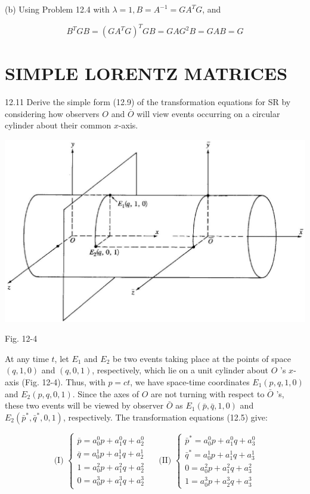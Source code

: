 \documentclass[10pt]{article}
\begin{document}
(b) Using Problem 12.4 with $\lambda=1, B=A^{-1}=G A^{T} G$, and

$$
B^{T} G B=\left(G A^{T} G\right)^{T} G B=G A G^{2} B=G A B=G
$$

\section*{SIMPLE LORENTZ MATRICES}
12.11 Derive the simple form (12.9) of the transformation equations for SR by considering how observers $O$ and $\bar{O}$ will view events occurring on a circular cylinder about their common $x$-axis.

\begin{center}
\includegraphics[max width=\textwidth]{2024_04_03_41f90be4f896e21f0dc9g-186}
\end{center}

Fig. 12-4

At any time $t$, let $E_{1}$ and $E_{2}$ be two events taking place at the points of space $(q, 1,0)$ and $(q, 0,1)$, respectively, which lie on a unit cylinder about $O$ 's $x$-axis (Fig. 12-4). Thus, with $p=c t$, we have space-time coordinates $E_{1}(p, q, 1,0)$ and $E_{2}(p, q, 0,1)$. Since the axes of $O$ are not turning with respect to $\bar{O}$ 's, these two events will be viewed by observer $\bar{O}$ as $E_{1}(\bar{p}, \bar{q}, 1,0)$ and $E_{2}\left(\bar{p}^{*}, \bar{q}^{*}, 0,1\right)$, respectively. The transformation equations (12.5) give:

$$
\text { (I) }\left\{\begin{array} { l } 
{ \overline { p } = a _ { 0 } ^ { 0 } p + a _ { 1 } ^ { 0 } q + a _ { 2 } ^ { 0 } } \\
{ \overline { q } = a _ { 0 } ^ { 1 } p + a _ { 1 } ^ { 1 } q + a _ { 2 } ^ { 1 } } \\
{ 1 = a _ { 0 } ^ { 2 } p + a _ { 1 } ^ { 2 } q + a _ { 2 } ^ { 2 } } \\
{ 0 = a _ { 0 } ^ { 3 } p + a _ { 1 } ^ { 3 } q + a _ { 2 } ^ { 3 } }
\end{array} \quad \text { (II) } \left\{\begin{array}{l}
\bar{p}^{*}=a_{0}^{0} p+a_{1}^{0} q+a_{3}^{0} \\
\bar{q}^{*}=a_{0}^{1} p+a_{1}^{1} q+a_{3}^{1} \\
0=a_{0}^{2} p+a_{1}^{2} q+a_{3}^{2} \\
1=a_{0}^{3} p+a_{2}^{3} q+a_{3}^{3}
\end{array}\right.\right.
$$
\end{document}
